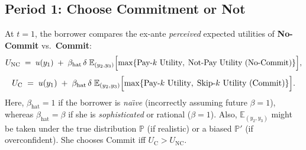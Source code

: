 \documentclass[11pt]{article}
\begin{document}
\subsection{Period 1: Choose Commitment or Not}

At \(t=1\), the borrower compares the ex-ante \emph{perceived} expected utilities of \textbf{No-Commit} vs.\ \textbf{Commit}:
\[
U_{\text{NC}}
\;=\;
u(y_1)
\;+\;
\beta_{\text{hat}}\,\delta 
\;\mathbb{E}_{(y_2,y_3)}\Bigl[
   \max\{\text{Pay-$k$ Utility},\;\text{Not-Pay Utility (No-Commit)}\}
\Bigr],
\]
\[
U_{\text{C}}
\;=\;
u(y_1)
\;+\;
\beta_{\text{hat}}\,\delta 
\;\mathbb{E}_{(y_2,y_3)}\Bigl[
  \max\{\text{Pay-$k$ Utility},\;\text{Skip-$k$ Utility (Commit)}\}
\Bigr].
\]
Here, \(\beta_{\text{hat}}=1\) if the borrower is \emph{na\"{\i}ve} (incorrectly assuming future \(\beta=1\)), whereas \(\beta_{\text{hat}}=\beta\) if she is \emph{sophisticated} or rational (\(\beta=1\)). Also, \(\mathbb{E}_{(y_2,y_3)}\) might be taken under the true distribution \(\mathbb{P}\) (if realistic) or a biased \(\mathbb{P}'\) (if overconfident). She chooses \(\text{Commit}\) iff \(U_{\text{C}} > U_{\text{NC}}\).



\end{document}
